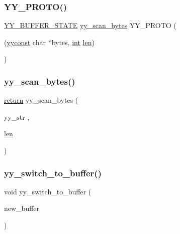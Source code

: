 \subsubsection{\texorpdfstring{Y\+Y\+\_\+\+P\+R\+O\+T\+O()}{YY\_PROTO()}\hspace{0.1cm}{\footnotesize\ttfamily [9/9]}}
{\footnotesize\ttfamily \mbox{\hyperlink{expr-lex_8cpp_a4e5bd2d129903df83f3d13effaf8f3e4}{Y\+Y\+\_\+\+B\+U\+F\+F\+E\+R\+\_\+\+S\+T\+A\+TE}} \mbox{\hyperlink{expr-lex_8cpp_a1171cd5559de417237e028ebb21b8e54}{yy\+\_\+scan\+\_\+bytes}} Y\+Y\+\_\+\+P\+R\+O\+TO (\begin{DoxyParamCaption}\item[{(\mbox{\hyperlink{expr-lex_8cpp_aa2f1a918be586b44bf08126bde2d7cc9}{yyconst}} char $\ast$bytes, \mbox{\hyperlink{_util_8cpp_a0ef32aa8672df19503a49fab2d0c8071}{int}} \mbox{\hyperlink{expr-lex_8cpp_afed088663f8704004425cdae2120b9b3}{len}})}]{ }\end{DoxyParamCaption})}

\mbox{\label{expr-lex_8cpp_a1171cd5559de417237e028ebb21b8e54}} 
\subsubsection{\texorpdfstring{yy\+\_\+scan\+\_\+bytes()}{yy\_scan\_bytes()}}
{\footnotesize\ttfamily \mbox{\hyperlink{gb_codes_c_b_8h_a9717e7bbecb906637e86cef6da3d83c2}{return}} yy\+\_\+scan\+\_\+bytes (\begin{DoxyParamCaption}\item[{yy\+\_\+str}]{,  }\item[{\mbox{\hyperlink{expr-lex_8cpp_afed088663f8704004425cdae2120b9b3}{len}}}]{ }\end{DoxyParamCaption})}

\mbox{\label{expr-lex_8cpp_a4f7f20d812f72fd97d855e769ad39cc5}} 
\subsubsection{\texorpdfstring{yy\+\_\+switch\+\_\+to\+\_\+buffer()}{yy\_switch\_to\_buffer()}\hspace{0.1cm}{\footnotesize\ttfamily [1/2]}}
{\footnotesize\ttfamily void yy\+\_\+switch\+\_\+to\+\_\+buffer (\begin{DoxyParamCaption}\item[{new\+\_\+buffer}]{ }\end{DoxyParamCaption})\hspace{0.3cm}{\ttfamily [new]}}

